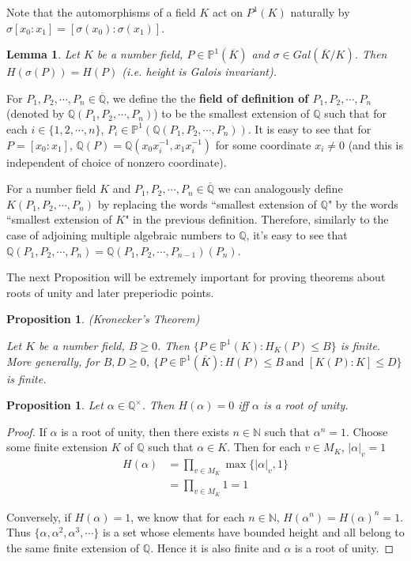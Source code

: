 \documentclass{amsart}
\newtheorem{lem}[thm]{Lemma}
\newtheorem{prop}[thm]{Proposition}
\newcommand{\N}{\mathbb{N}}
\newcommand{\Q}{\mathbb{Q}}
\renewcommand{\P}{\mathbb{P}}
\begin{document}
Note that the automorphisms of a field $K$ act on $P^1(K)$ naturally by $\sigma[x_0:x_1] = [\sigma(x_0):\sigma(x_1)]$.

\begin{lem}
Let $K$ be a number field, $P \in \P^1(\overline{K})$ and $\sigma \in Gal(\overline{K}/K)$. Then $H(\sigma(P)) = H(P)$ (i.e. height is Galois invariant).
\end{lem}

For $P_1, P_2, \cdots, P_n \in \overline{\Q}$, we define the the \textbf{field of definition of $P_1, P_2, \cdots, P_n$} (denoted by $\Q(P_1, P_2, \cdots, P_n)$) to be the smallest extension of $\Q$ such that for each $i \in \{1,2, \cdots, n\}$, $P_i \in \P^1(\Q(P_1, P_2, \cdots, P_n))$. It is easy to see that for $P=[x_0:x_1]$, $\Q(P)=\Q(x_0x_i^{-1},x_1x_i^{-1})$ for some coordinate $x_i \neq 0$ (and this is independent of choice of nonzero coordinate).

For a number field $K$ and $P_1, P_2, \cdots, P_n \in \overline{\Q}$ we can analogously define $K(P_1, P_2, \cdots, P_n)$ by replacing the words ``smallest extension of $\Q$" by the words ``smallest extension of $K$" in the previous definition. Therefore, similarly to the case of adjoining multiple algebraic numbers to $\Q$, it's easy to see that $\Q(P_1,P_2, \cdots, P_n) = \Q (P_1,P_2, \cdots, P_{n-1})(P_n)$.

The next Proposition will be extremely important for proving theorems about roots of unity and later preperiodic points.

\begin{prop}{(Kronecker's Theorem)}

Let $K$ be a number field, $B \geq 0$. Then $\{P \in \P^1(K):H_K(P) \leq B\}$ is finite. More generally, for $B,D \geq 0$,  $\{P \in \P^1(\overline{K}):H(P) \leq B\ \text{and } [K(P):K] \leq D\}$ is finite.

\end{prop}

\begin{prop}

Let $\alpha \in \Q^{\times}$. Then $H(\alpha) = 0$ iff $\alpha$ is a root of unity. 

\end{prop}


\begin{proof}

If $\alpha$ is a root of unity, then there exists $n \in \N$ such that $\alpha^n = 1$. Choose some finite extension $K$ of $\Q$ such that $\alpha \in K$.   
Then for each $v \in M_K$, $|\alpha|_v = 1$
\begin{align*}
H(\alpha) 
&= \prod_{v \in M_K} \max\{|\alpha|_v,1\}\\
&= \prod_{v \in M_K} 1 = 1
\end{align*}

Conversely, if $H(\alpha)=1$, we know that for each $n \in \N$, $H(\alpha^n) = H(\alpha)^n = 1$. Thus $\{\alpha, \alpha^2, \alpha^3, \cdots\}$ is a set whose elements have bounded height and all belong to the same finite extension of $\Q$. Hence it is also finite and $\alpha$ is a root of unity.

\end{proof}
\end{document}
